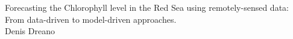 

\chapter*{}

\doublespacing
{}

\begin{center}
\Large {Forecasting the Chlorophyll level in the Red Sea using remotely-sensed data: From data-driven to model-driven approaches.\\
Denis Dreano}
\end{center}
